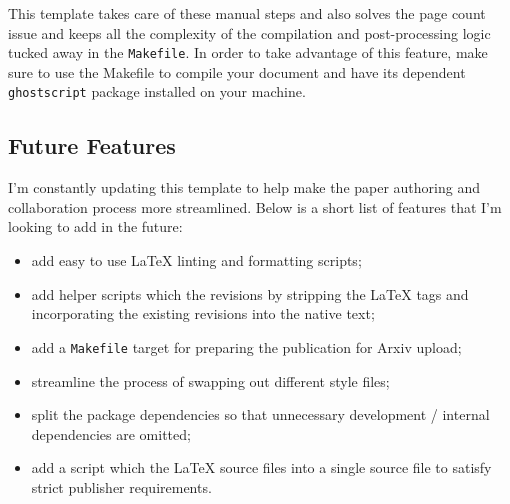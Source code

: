 This template takes care of these manual steps and also solves the page count issue and keeps all the complexity of the compilation and post-processing logic tucked away in the \texttt{Makefile}.
In order to take advantage of this feature, make sure to use the Makefile to compile your document and have its dependent \texttt{ghostscript} package installed on your machine.

\subsection{Future Features}
\label{sec:howto:future-features}

I'm constantly updating this template to help make the paper authoring and collaboration process more streamlined.
Below is a short list of features that I'm looking to add in the future:
%
\begin{itemize}
    \item add easy to use \LaTeX{} linting and formatting scripts;
    \item add helper scripts which  the revisions by stripping the \LaTeX{} tags and incorporating the existing revisions into the native text;
    \item add a \texttt{Makefile} target for preparing the publication for Arxiv upload;
    \item streamline the process of swapping out different style files;
    \item split the package dependencies so that unnecessary development / internal dependencies are omitted;
    \item add a script which  the \LaTeX{} source files into a single source file to satisfy strict publisher requirements.
\end{itemize}